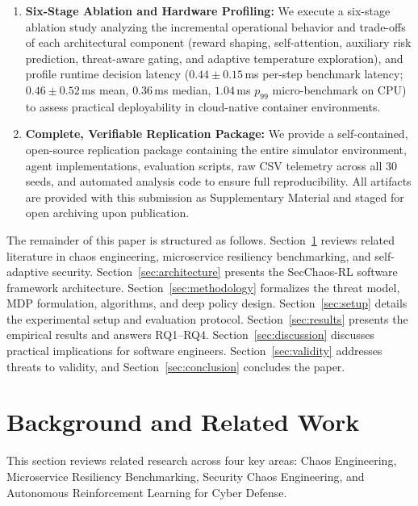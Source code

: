 \documentclass[11pt,a4paper]{article}
\begin{document}
\begin{enumerate}
    \item \textbf{Six-Stage Ablation and Hardware Profiling:} We execute a six-stage ablation study analyzing the incremental operational behavior and trade-offs of each architectural component (reward shaping, self-attention, auxiliary risk prediction, threat-aware gating, and adaptive temperature exploration), and profile runtime decision latency ($0.44 \pm 0.15$\,ms per-step benchmark latency; $0.46 \pm 0.52$\,ms mean, $0.36$\,ms median, $1.04$\,ms $p_{99}$ micro-benchmark on CPU) to assess practical deployability in cloud-native container environments.
    \item \textbf{Complete, Verifiable Replication Package:} We provide a self-contained, open-source replication package containing the entire simulator environment, agent implementations, evaluation scripts, raw CSV telemetry across all 30 seeds, and automated analysis code to ensure full reproducibility. All artifacts are provided with this submission as Supplementary Material and staged for open archiving upon publication.
\end{enumerate}

The remainder of this paper is structured as follows. Section~\ref{sec:related_work} reviews related literature in chaos engineering, microservice resiliency benchmarking, and self-adaptive security. Section~\ref{sec:architecture} presents the SecChaos-RL software framework architecture. Section~\ref{sec:methodology} formalizes the threat model, MDP formulation, algorithms, and deep policy design. Section~\ref{sec:setup} details the experimental setup and evaluation protocol. Section~\ref{sec:results} presents the empirical results and answers RQ1–RQ4. Section~\ref{sec:discussion} discusses practical implications for software engineers. Section~\ref{sec:validity} addresses threats to validity, and Section~\ref{sec:conclusion} concludes the paper.

\section{Background and Related Work}
\label{sec:related_work}

This section reviews related research across four key areas: Chaos Engineering, Microservice Resiliency Benchmarking, Security Chaos Engineering, and Autonomous Reinforcement Learning for Cyber Defense.
\end{document}

